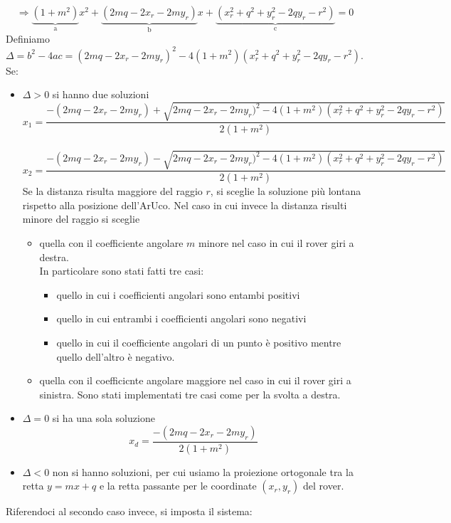 \begin{equation*}
\Rightarrow \underbrace{(1+m^2)}_\text{a}x^2+\underbrace{(2mq-2x_r-2my_r)}_\text{b}x+\underbrace{(x_r^2+q^2+y_r^2-2qy_r-r^2)}_\text{c}=0
\end{equation*}
Definiamo $\Delta=b^2-4ac=(2mq-2x_r-2my_r)^2-4(1+m^2)(x_r^2+q^2+y_r^2-2qy_r-r^2)$. \\Se:
\begin{itemize}
    \item $\Delta>0$ si hanno due soluzioni
        \begin{equation}
        x_1=\frac{-(2mq-2x_r-2my_r)+\sqrt{2mq-2x_r-2my_r)^2-4(1+m^2)(x_r^2+q^2+y_r^2-2qy_r-r^2)}}{2(1+m^2)}
        \end{equation}
        \\
        \begin{equation}
        x_2=\frac{-(2mq-2x_r-2my_r)-\sqrt{2mq-2x_r-2my_r)^2-4(1+m^2)(x_r^2+q^2+y_r^2-2qy_r-r^2)}}{2(1+m^2)}
        \end{equation}
        Se la distanza risulta maggiore del raggio $r$, si sceglie la soluzione più lontana rispetto alla posizione dell'ArUco.
        Nel caso in cui invece la distanza risulti minore del raggio si sceglie 
        \begin{itemize}
            \item quella con il coefficiente angolare $m$ minore nel caso in cui il rover giri a destra. \\In particolare sono stati fatti tre casi:
            \begin{itemize}
            \item quello in cui i coefficienti angolari sono entambi positivi
            \item quello in cui entrambi i coefficienti angolari sono negativi
            \item quello in cui il coefficiente angolari di un punto è positivo mentre quello dell'altro è negativo.
            \end{itemize}
            \item quella con il coefficicnte angolare maggiore nel caso in cui il rover giri a sinistra. Sono stati implementati tre casi come per la svolta a destra.
        \end{itemize}
    \item $\Delta=0$ si ha una sola soluzione
    \begin{equation}
        x_d=\frac{-(2mq-2x_r-2my_r)}{2(1+m^2)}
        \end{equation}
    \item $\Delta<0$ non si hanno soluzioni, per cui usiamo la proiezione ortogonale tra la retta $y=mx+q$ e la retta passante per le coordinate $(x_r, y_r)$ del rover.
\end{itemize}
Riferendoci al secondo caso invece, si imposta il sistema:

